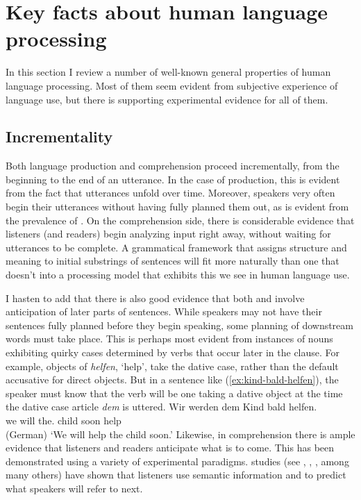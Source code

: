 \documentclass[output=paper
	        ,collection
	        ,collectionchapter
 	        ,biblatex
                ,babelshorthands
                ,newtxmath
                ,draftmode
                ,colorlinks, citecolor=brown
]{langscibook}
\begin{document}
\section{Key facts about human language processing}
\label{sec-key-facts}

In this section I review a number of well-known general properties of human language processing.  Most of them seem evident from subjective experience of language use, but there is supporting experimental evidence for all of them.  

\subsection{Incrementality}

Both language production and comprehension proceed incrementally, from the beginning to the end of an utterance.  In the case of production, this is evident from the fact that utterances unfold over time.  Moreover, speakers very often begin their utterances without having fully planned them out, as is evident from the prevalence of .  On the comprehension side, there is considerable evidence that listeners (and readers) begin analyzing input right away, without waiting for utterances to be complete.  A grammatical framework that assigns structure and meaning to initial substrings of sentences will fit more naturally than one that doesn't into a processing model that exhibits this  we see in human language use.  

I hasten to add that there is also good evidence that both  and  involve anticipation of later parts of sentences.  While speakers may not have their sentences fully planned before they begin speaking, some planning of downstream words must take place.  This is perhaps most evident from instances of nouns exhibiting quirky cases determined by verbs that occur later in the clause.  For example, objects of  \emph{helfen}, `help', take the dative case, rather than the default accusative for direct objects.  But in a sentence like (\ref{ex:kind-bald-helfen}), the speaker must know that the verb will be one taking a dative object at the time the dative case article \emph{dem} is uttered.
\ea\label{ex:kind-bald-helfen}
\gll Wir werden dem        Kind bald helfen.\\
     we will    the.\DAT{} child soon help\\\hfill (German)
\glt `We will help the child soon.'
\z
Likewise, in comprehension there is ample evidence that listeners and readers anticipate what is to
come.  This has been demonstrated using a variety of experimental paradigms.  
studies (see \citealt{TanenhausEtal1995}, \citealt{AltmannKamide99}, \citealt{ArnoldEtal2007}, among
many others) have shown that listeners use semantic information and  to predict
what speakers will refer to next. 
\end{document}
